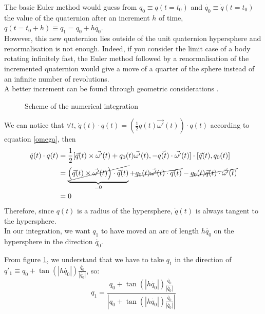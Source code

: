 \documentclass[class=report, float=false, crop=false]{standalone}
\begin{document}
The basic Euler method would guess from $q_0 \equiv q(t = t_0)$ and $\dot{q_0} \equiv \dot{q}(t = t_0)$ the value of the quaternion after an increment $h$ of time, $q(t = t_0 + h) \equiv q_1 = q_0 + h \dot{q_0}$.\\

However, this new quaternion lies outside of the unit quaternion hypersphere and renormalisation is not enough. Indeed, if you consider the limit case of a body rotating infinitely fast, the Euler method followed by a renormalisation of the incremented quaternion would give a move of a quarter of the sphere instead of an infinite number of revolutions.\\

A better increment can be found through geometric considerations \cite{kleppmann2007simulation}.

\begin{figure}[h!]
\centering

\caption{Scheme of the numerical integration}
\label{num_int_quat}
\end{figure}

We can notice that $\forall t$, $\dot{q}(t)\cdot q(t) = \left(\frac{1}{2}q(t)\vec{\omega'}(t)\right)\cdot q(t)$ according to equation \ref{omega}, then
\begin{align*}
\dot{q}(t)\cdot q(t) &= \frac{1}{2}[\vec{q}(t)\times \vec{\omega'}(t) + q_0(t)\vec{\omega'}(t),-\vec{q(t)}\cdot\vec{\omega'}(t)]\cdot[\vec{q}(t),q_0(t)]\\
&=\underbrace{\cancel{\left(\vec{q}(t)\times\vec{\omega'}(t)\right)\cdot\vec{q}(t)}}_{=0} + \cancel{q_0(t) \vec{\omega'}(t)\cdot \vec{q}(t)} - \cancel{q_0(t)\vec{q}(t)\cdot\vec{\omega'}(t)}\\
&=0
\end{align*}
Therefore, since $q(t)$ is a radius of the hypersphere, $\dot{q}(t)$ is always tangent to the hypersphere.\\

In our integration, we want $q_1$ to have moved an arc of length $h\dot{q_0}$ on the hypersphere in the direction $\dot{q_0}$.

From figure \ref{num_int_quat}, we understand that we have to take $q_1$ in the direction of $q'_1 \equiv q_0 + \tan(|h\dot{q_0}|)\frac{\dot{q_0}}{|\dot{q_0}|}$, so:
\begin{equation}
\boxed{q_1 = \frac{q_0 + \tan(|h\dot{q_0}|)\frac{\dot{q_0}}{|\dot{q_0}|}}{|q_0 + \tan(|h\dot{q_0}|)\frac{\dot{q_0}}{|\dot{q_0}|}|}}
\label{int_kleppmann}
\end{equation}
\end{document}
